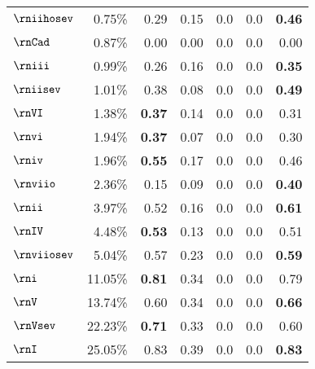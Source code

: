 \begin{tabular}{l|rrrrrr}
$\rniihosev$   & 0.75\%                 & 0.29                 & 0.15             &  0.0   &  0.0  & \textbf{0.46}  \\
$\rnCad$       & 0.87\%                 & 0.00                 & 0.00             &  0.0   &  0.0  & 0.00           \\
$\rniii$       & 0.99\%                 & 0.26                 & 0.16             &  0.0   &  0.0  & \textbf{0.35}  \\
$\rniisev$     & 1.01\%                 & 0.38                 & 0.08             &  0.0   &  0.0  & \textbf{0.49}  \\
$\rnVI$        & 1.38\%                 & \textbf{0.37}        & 0.14             &  0.0   &  0.0  & 0.31           \\
$\rnvi$        & 1.94\%                 & \textbf{0.37}        & 0.07             &  0.0   &  0.0  & 0.30           \\
$\rniv$        & 1.96\%                 & \textbf{0.55}        & 0.17             &  0.0   &  0.0  & 0.46           \\
$\rnviio$      & 2.36\%                 & 0.15                 & 0.09             &  0.0   &  0.0  & \textbf{0.40}  \\
$\rnii$        & 3.97\%                 & 0.52                 & 0.16             &  0.0   &  0.0  & \textbf{0.61}  \\
$\rnIV$        & 4.48\%                 & \textbf{0.53}        & 0.13             &  0.0   &  0.0  & 0.51           \\
$\rnviiosev$   & 5.04\%                 & 0.57                 & 0.23             &  0.0   &  0.0  & \textbf{0.59}  \\
$\rni$         & 11.05\%                & \textbf{0.81}        & 0.34             &  0.0   &  0.0  & 0.79           \\
$\rnV$         & 13.74\%                & 0.60                 & 0.34             &  0.0   &  0.0  & \textbf{0.66}  \\
$\rnVsev$      & 22.23\%                & \textbf{0.71}        & 0.33             &  0.0   &  0.0  & 0.60           \\
$\rnI$         & 25.05\%                & 0.83                 & 0.39             &  0.0   &  0.0  & \textbf{0.83}     
\end{tabular}
